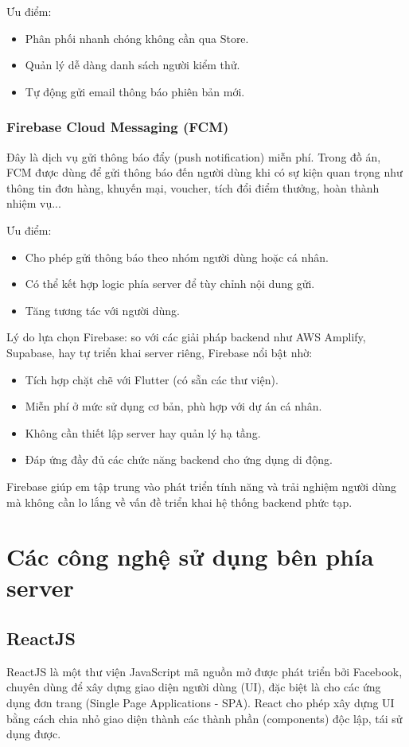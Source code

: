 \documentclass[../DoAn.tex]{subfiles}
\begin{document}
Ưu điểm:
\begin{itemize}
\item Phân phối nhanh chóng không cần qua Store.
\item Quản lý dễ dàng danh sách người kiểm thử.
\item Tự động gửi email thông báo phiên bản mới.
\end{itemize}

\subsubsection{Firebase Cloud Messaging (FCM)}
Đây là dịch vụ gửi thông báo đẩy (push notification) miễn phí. Trong đồ án, FCM được dùng để gửi thông báo đến người dùng khi có sự kiện quan trọng như thông tin đơn hàng, khuyến mại, voucher, tích đổi điểm thưởng, hoàn thành nhiệm vụ...

Ưu điểm:
\begin{itemize}
\item Cho phép gửi thông báo theo nhóm người dùng hoặc cá nhân.
\item Có thể kết hợp logic phía server để tùy chỉnh nội dung gửi.
\item Tăng tương tác với người dùng.
\end{itemize}

Lý do lựa chọn Firebase: so với các giải pháp backend như AWS Amplify, Supabase, hay tự triển khai server riêng, Firebase nổi bật nhờ:
\begin{itemize}
\item Tích hợp chặt chẽ với Flutter (có sẵn các thư viện).
\item Miễn phí ở mức sử dụng cơ bản, phù hợp với dự án cá nhân.
\item Không cần thiết lập server hay quản lý hạ tầng.
\item Đáp ứng đầy đủ các chức năng backend cho ứng dụng di động.
\end{itemize}

Firebase giúp em tập trung vào phát triển tính năng và trải nghiệm người dùng mà không cần lo lắng về vấn đề triển khai hệ thống backend phức tạp.

\section{Các công nghệ sử dụng bên phía server}

\subsection{ReactJS\cite{ReactJS}}
ReactJS là một thư viện JavaScript mã nguồn mở được phát triển bởi Facebook, chuyên dùng để xây dựng giao diện người dùng (UI), đặc biệt là cho các ứng dụng đơn trang (Single Page Applications - SPA). React cho phép xây dựng UI bằng cách chia nhỏ giao diện thành các thành phần (components) độc lập, tái sử dụng được.
\end{document}
